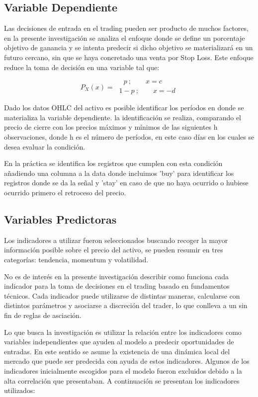 \documentclass[a4paper,12pt]{Latex/Classes/PhDthesisPSnPDF}
\begin{document}
\subsection{Variable Dependiente}

Las decisiones de entrada en el trading pueden ser producto de muchos factores, en la presente investigación se analiza el enfoque donde se define un porcentaje objetivo de ganancia y se intenta predecir si dicho objetivo se materializará en un futuro cercano, sin que se haya concretado una venta por Stop Loss. Este enfoque reduce la toma de decisión en una variable tal que:

$$
P_{X}(x) = 
\begin{array}{ll} 
\ \ \ \ p \ ; \qquad x = c
\\
\ 1-p \ ; \qquad x = -d
\end{array}
$$

Dado los datos OHLC del activo es posible identificar los períodos en donde se materializa la variable dependiente. la identificación se realiza, comparando el precio de cierre con los precios máximos y mínimos de las siguientes h observaciones, donde h es el número de períodos, en este caso días en los cuales se desea evaluar la condición.

En la práctica se identifica los registros que cumplen con esta condición añadiendo una columna a la data donde incluimos 'buy' para identificar los registros donde se da la señal y 'stay' en caso de que no haya ocurrido o hubiese ocurrido primero el retroceso del precio.

\subsection{Variables Predictoras}

Los indicadores a utilizar fueron seleccionados buscando recoger la mayor información posible sobre el precio del activo, se pueden resumir en tres categorías: tendencia, momentum y volatilidad.

No es de interés en la presente investigación describir como funciona cada indicador para la toma de decisiones en el trading basado en fundamentos técnicos. Cada indicador puede utilizarse de distintas maneras, calcularse con distintos parámetros y asociarse a discreción del trader, lo que conlleva a un sin fin de reglas de asciación. 

Lo que busca la investigación es utilizar la relación entre los indicadores como variables independientes que ayuden al modelo a predecir oportunidades de entradas. En este sentido se asume la existencia de una dinámica local del mercado que puede ser predecida con ayuda de estos indicadores. Algunos de los indicadores inicialmente escogidos para el modelo fueron excluidos debido a la alta correlación que presentaban. A continuación se presentan los indicadores utilizados:
\end{document}
